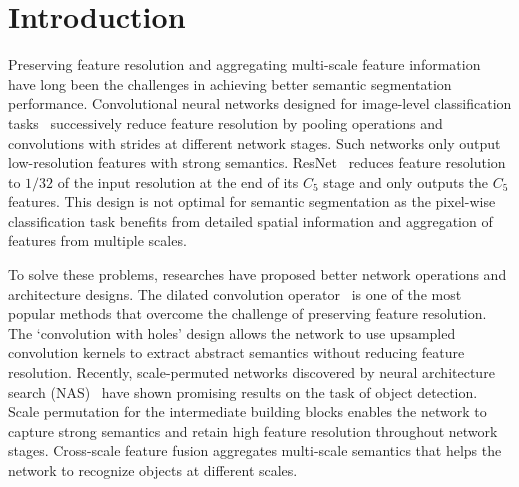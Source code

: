 \documentclass[10pt,twocolumn,letterpaper]{article}
\begin{document}
\section{Introduction}\label{sec:intro}
Preserving feature resolution and aggregating multi-scale feature information have long been the challenges in achieving better semantic segmentation performance. Convolutional neural networks designed for image-level classification tasks~\cite{alexnet,vgg,inceptionv2,inceptionv3,inceptionv4,xception,resnet,mobilenetv2,mobilenetv3} successively reduce feature resolution by pooling operations and convolutions with strides at different network stages. Such networks only output low-resolution features with strong semantics. \eg ResNet~\cite{resnet} reduces feature resolution to $1/32$ of the input resolution at the end of its $C_5$ stage and only outputs the $C_5$ features. This design is not optimal for semantic segmentation as the pixel-wise classification task benefits from detailed spatial information and aggregation of features from multiple scales.

To solve these problems, researches have proposed better network operations and architecture designs. The dilated convolution operator~\cite{epitomic_conv,Yu2016MultiScaleCA,Chen2015SemanticIS,deeplabv1,deeplabv3,deeplabv3plus} is one of the most popular methods that overcome the challenge of preserving feature resolution. The `convolution with holes' design allows the network to use upsampled convolution kernels to extract abstract semantics without reducing feature resolution. Recently, scale-permuted networks discovered by neural architecture search (NAS)~\cite{spinenet,Du2020EfficientSB} have shown promising results on the task of object detection. Scale permutation for the intermediate building blocks enables the network to capture strong semantics and retain high feature resolution throughout network stages. Cross-scale feature fusion aggregates multi-scale semantics that helps the network to recognize objects at different scales.
\end{document}
